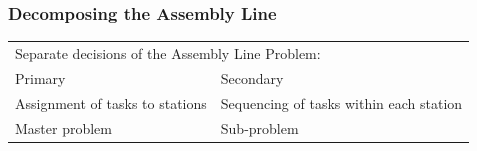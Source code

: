\documentclass{beamer}
\begin{document}
\begin{frame}
\frametitle{Decomposing the Assembly Line}
\begin{table}[tpb]
	\setlength{\tabcolsep}{3mm}
	\centering
	\begin{tabular}{p{}p{}}
		\multicolumn{2}{l}{Separate decisions of the Assembly Line Problem:}\\[3mm]\pause
		{\color{red} Primary} & {\color{red} Secondary}\\[2mm]
		Assignment of tasks to stations & Sequencing of tasks within each station\pause\\[2mm]
		Master problem & Sub-problem\pause
	\end{tabular}
\end{table}


\end{frame}
\end{document}
